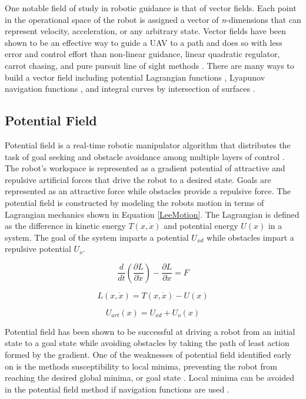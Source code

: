 \documentclass[numbered,pdftex]{ohio-etd}
\begin{document}
One notable field of study in robotic guidance is that of vector fields. Each point in the operational space of the robot is assigned a vector of \textit{n}-dimensions that can represent velocity, acceleration, or any arbitrary state. Vector fields have been shown to be an effective way to guide a UAV to a path and does so with less error and control effort than non-linear guidance, linear quadratic regulator, carrot chasing, and pure pursuit line of sight methods \cite{sujit_unmanned_2014}. There are many ways to build a vector field including potential Lagrangian functions \cite{khatib_real-time_1986}, Lyapunov navigation functions \cite{esposito_method_2002}\cite{frew_lyapunov_nodate} \cite{nelson_cooperative_2005}, and integral curves by intersection of surfaces \cite{goncalves_artificial_2009} \cite{goncalves_vector_2010}.


\subsection{Potential Field}
Potential field is a real-time robotic manipulator algorithm that distributes the task of goal seeking and obstacle avoidance among multiple layers of control \cite{khatib_real-time_1986}. The robot's workspace is represented as a gradient potential of attractive and repulsive artificial forces that drive the robot to a desired state. Goals are represented as an attractive force while obstacles provide a repulsive force. The potential field is constructed by modeling the robots motion in terms of Lagrangian mechanics shown in Equation \ref{LeeMotion}. The Lagrangian is defined as the difference in kinetic energy $T(x,\dot{x})$ and potential energy $U(x)$ in a system. The goal of the system imparts a potential $U_{xd}$ while obstacles impart a repulsive potential $U_o$. 

\begin{equation}\label{LeeMotion}
\frac{d}{dt} \left(\frac{\partial L}{\partial \dot{x}}\right) - \frac{\partial L}{\partial x} = F
\end{equation}

\begin{equation}\label{lagrange}
L(x,\dot{x}) = T(x,\dot{x}) - U(x)
\end{equation}

\begin{equation}\label{potential}
U_{art}(x) = U_{xd} + U_o(x)
\end{equation}

Potential field has been shown to be successful at driving a robot from an initial state to a goal state while avoiding obstacles by taking the path of least action formed by the gradient. One of the weaknesses of potential field identified early on is the methods susceptibility to local minima, preventing the robot from reaching the desired global minima, or goal state \cite{koren_potential_1991}. Local minima can be avoided in the potential field method if navigation functions are used \cite{goerzen_survey_2010}.\\
\end{document}
